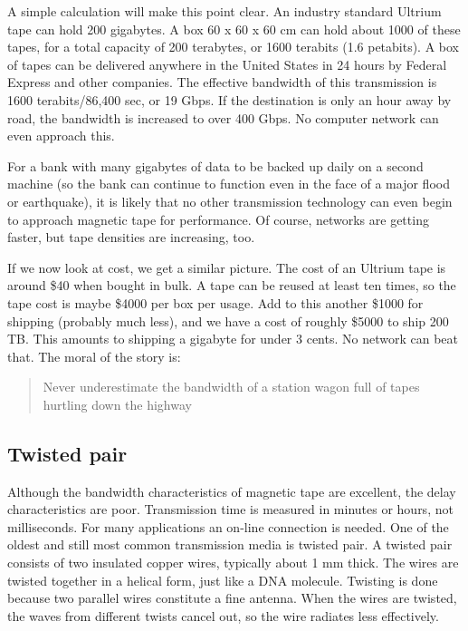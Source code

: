 \documentclass[b5paper,11pt]{memoir}
\begin{document}
A simple calculation will make this point clear. An industry standard
Ultrium tape can hold 200 gigabytes. A box 60 x 60 x 60 cm can hold
about 1000 of these tapes, for a total capacity of 200 terabytes, or
1600 terabits (1.6 petabits). A box of tapes can be delivered anywhere
in the United States in 24 hours by Federal Express and other companies.
The effective bandwidth of this transmission is 1600 terabits/86,400
sec, or 19 Gbps. If the destination is only an hour away by road, the
bandwidth is increased to over 400 Gbps. No computer network can even
approach this.

For a bank with many gigabytes of data to be backed up daily on a second
machine (so the bank can continue to function even in the face of a
major flood or earthquake), it is likely that no other transmission
technology can even begin to approach magnetic tape for performance. Of
course, networks are getting faster, but tape densities are increasing,
too.

If we now look at cost, we get a similar picture. The cost of an Ultrium
tape is around \$40 when bought in bulk. A tape can be reused at least
ten times, so the tape cost is maybe \$4000 per box per usage. Add to
this another \$1000 for shipping (probably much less), and we have a
cost of roughly \$5000 to ship 200 TB. This amounts to shipping a
gigabyte for under 3 cents. No network can beat that. The moral of the
story is:

\begin{quote}
{Never underestimate the bandwidth of a station wagon full of tapes
hurtling down the highway}
\end{quote}

\protect\hypertarget{0130661023_ch02lev1sec2.htmlux5cux23ch02lev2sec5}{}{}

\subsection{Twisted pair}

Although the bandwidth characteristics of magnetic tape are excellent,
the delay characteristics are poor. Transmission time is measured in
minutes or hours, not milliseconds. For many applications an on-line
connection is needed. One of the oldest and still most common
transmission media is {twisted pair}. A twisted pair consists of two
insulated copper wires, typically about 1 mm thick. The wires are
twisted together in a helical form, just like a DNA molecule. Twisting
is done because two parallel wires constitute a fine antenna. When the
wires are twisted, the waves from different twists cancel out, so the
wire radiates less effectively.
\end{document}
